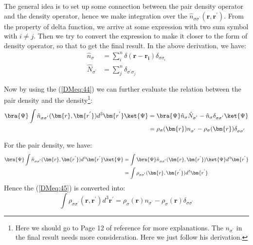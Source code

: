 The general idea is to set up some connection between the pair density
operator and the density operator, hence we make integration over the
$\hat{n}_{\sigma\sigma^{'}}(\bm{r}, \bm{r^{'}})$. From the property of
delta function, we arrive at some expression with two sum symbol with
$i\neq j$. Then we try to convert the expression to make it closer to
the form of density operator, so that to get the final result. In the
above derivation, we have:
\begin{equation}
 \begin{split}
  \hat{n}_{\sigma} &= \sum_{i}^{n}\delta(\bm{r} -
  \bm{r_{i}})\delta_{\sigma\sigma_{i}} \\
  \hat{N}_{\sigma^{'}} &= \sum_{j}^{n}\delta_{\sigma^{'}\sigma_{j}}
 \end{split}
\end{equation}

Now by using the (\ref{DMeq:44}) we can further evaluate the relation
between the pair density and the density\footnote{Here we should go 
to Page 12 of reference\cite{2004PhST..109....9V} for more explanations. 
The $n_{\sigma^{'}}$ in the final result needs more consideration. Here
we just follow his derivation.}:
\begin{equation}
\begin{split}
  \bra{\Psi}\int\hat{n}_{\sigma\sigma^{'}}(\bm{r},
  \bm{r^{'}})d^{3}\bm{r^{'}} \ket{\Psi} &=
  \bra{\Psi}\hat{n}_{\sigma}\hat{N}_{\sigma^{'}} -
  \hat{n}_{\sigma}\delta_{\sigma\sigma^{'}}\ket{\Psi} \\
&= \rho_{\sigma}(\bm{r})n_{\sigma^{'}} -
\rho_{\sigma}(\bm{r})\delta_{\sigma\sigma^{'}}
\end{split}
\label{DMeq:45}
\end{equation}


For the pair density, we have:
\begin{align}
  \label{DMeq:46}
  \bra{\Psi}\int\hat{n}_{\sigma\sigma^{'}}(\bm{r},
  \bm{r^{'}})d^{3}\bm{r^{'}} \ket{\Psi} &= \int
  \bra{\Psi}\hat{n}_{\sigma\sigma^{'}}(\bm{r},
  \bm{r^{'}}) \ket{\Psi} d^{3}\bm{r^{'}} \nonumber \\
  &= \int \rho_{\sigma\sigma^{'}}(\bm{r}, \bm{r^{'}}) d^{3}\bm{r^{'}}
\end{align}
Hence the (\ref{DMeq:45}) is converted into:
\begin{equation}
  \label{DMeq:47}
  \int \rho_{\sigma\sigma^{'}}(\bm{r}, \bm{r^{'}}) d^{3}\bm{r^{'}} =
\rho_{\sigma}(\bm{r})n_{\sigma^{'}} -
\rho_{\sigma}(\bm{r})\delta_{\sigma\sigma^{'}}  
\end{equation}

